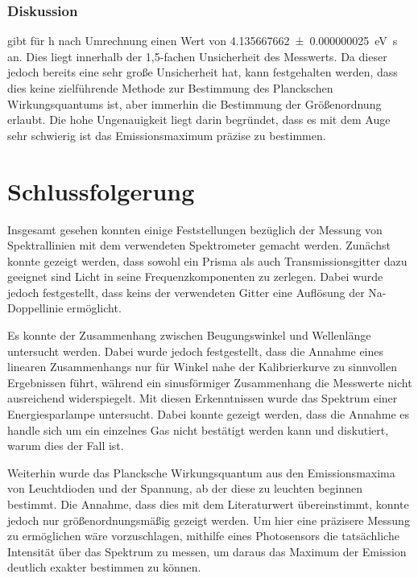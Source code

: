 \documentclass[
	a4paper,
	12pt,
	pagesize,
	ngerman
]{scrartcl}
\begin{document}
	
	\subsubsection{Diskussion}
	
	\cite{Planck} gibt für h nach Umrechnung einen Wert von \SI{4.135667662 \pm 0.000000025}{\electronvolt \second} an.
	Dies liegt innerhalb der 1,5-fachen Unsicherheit des Messwerts.
	Da dieser jedoch bereits eine sehr große Unsicherheit hat, kann festgehalten werden, dass dies keine zielführende Methode zur Bestimmung des Planckschen Wirkungsquantums ist, aber immerhin die Bestimmung der Größenordnung erlaubt.
	Die hohe Ungenauigkeit liegt darin begründet, dass es mit dem Auge sehr schwierig ist das Emissionsmaximum präzise zu bestimmen.
	
	
	
	\section{Schlussfolgerung}
	Insgesamt gesehen konnten einige Feststellungen bezüglich der Messung von Spektrallinien mit dem verwendeten Spektrometer gemacht werden.
	Zunächst konnte gezeigt werden, dass sowohl ein Prisma als auch Transmissionsgitter dazu geeignet sind Licht in seine Frequenzkomponenten zu zerlegen.
	Dabei wurde jedoch festgestellt, dass keins der verwendeten Gitter eine Auflösung der Na-Doppellinie ermöglicht.
	
	Es konnte der Zusammenhang zwischen Beugungswinkel und Wellenlänge untersucht werden.
	Dabei wurde jedoch festgestellt, dass die Annahme eines linearen Zusammenhangs nur für Winkel nahe der Kalibrierkurve zu sinnvollen Ergebnissen führt, während ein sinusförmiger Zusammenhang die Messwerte nicht ausreichend widerspiegelt.
	Mit diesen Erkenntnissen wurde das Spektrum einer Energiesparlampe untersucht.
	Dabei konnte gezeigt werden, dass die Annahme es handle sich um ein einzelnes Gas nicht bestätigt werden kann und diskutiert, warum dies der Fall ist.
	
	Weiterhin wurde das Plancksche Wirkungsquantum aus den Emissionsmaxima von Leuchtdioden und der Spannung, ab der diese zu leuchten beginnen bestimmt.
	Die Annahme, dass dies mit dem Literaturwert übereinstimmt, konnte jedoch nur größenordnungsmäßig gezeigt werden.
	Um hier eine präzisere Messung zu ermöglichen wäre vorzuschlagen, mithilfe eines Photosensors die tatsächliche Intensität über das Spektrum zu messen, um daraus das Maximum der Emission deutlich exakter bestimmen zu können.
	\printbibliography
\end{document}
